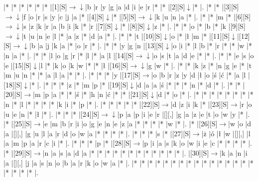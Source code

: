 \documentclass[11pt]{article}
\newcommand\drarr{$\rightarrow \!\!\!\!\! \downarrow$}
\newcommand\rarr{$\rightarrow$}
\newcommand\darr{$\downarrow$}
\begin{document}
\noindent\begin{Puzzle}{19}{21}|*	|*	|*	|*	|*	|*	|[1][S]\drarr	|b	|r	|y	|g	|a	|d	|i	|e	|r	|*	|*	|[2][S]\darr	|*	|.
|*	|*	|[3][S]\drarr	|f	|o	|r	|s	|y	|c	|j	|a	|*	|[4][S]\darr	|*	|[5][S]\drarr	|k	|u	|n	|a	|*	|.
|*	|*	|m	|*	|[6][S]\drarr	|s	|z	|k	|r	|a	|b	|i	|k	|*	|r	|[7][S]\darr	|*	|[8][S]\darr	|z	|*	|.
|*	|*	|o	|*	|b	|*	|k	|[9][S]\drarr	|t	|u	|n	|e	|l	|*	|a	|z	|*	|d	|a	|*	|.
|*	|*	|t	|[10][S]\darr	|o	|*	|ł	|m	|*	|[11][S]\darr	|[12][S]\drarr	|b	|a	|j	|k	|a	|*	|o	|r	|*	|.
|*	|*	|y	|g	|n	|[13][S]\darr	|o	|i	|*	|l	|b	|*	|r	|*	|*	|w	|*	|n	|a	|*	|.
|*	|*	|l	|o	|g	|r	|*	|l	|*	|a	|l	|[14][S]\drarr	|o	|s	|t	|a	|d	|e	|*	|*	|.
|*	|*	|e	|s	|o	|e	|[15][S]\darr	|l	|*	|k	|o	|k	|w	|*	|*	|ł	|[16][S]\drarr	|g	|w	|*	|.
|*	|*	|k	|z	|*	|n	|g	|e	|*	|t	|m	|u	|n	|*	|*	|a	|l	|a	|*	|*	|.
|*	|*	|*	|y	|[17][S]\rarr	|o	|b	|r	|z	|y	|d	|ł	|o	|ś	|ć	|*	|a	|l	|[18][S]\darr	|*	|.
|*	|*	|*	|z	|*	|m	|p	|*	|[19][S]\darr	|d	|a	|a	|ś	|*	|*	|*	|n	|*	|d	|*	|.
|*	|*	|[20][S]\rarr	|m	|p	|a	|*	|*	|ś	|*	|h	|n	|ć	|*	|*	|[21][S]\darr	|d	|*	|o	|*	|.
|*	|*	|*	|*	|*	|*	|*	|*	|n	|*	|l	|*	|*	|*	|*	|k	|i	|*	|p	|*	|.
|*	|*	|*	|*	|*	|[22][S]\rarr	|d	|z	|i	|k	|*	|[23][S]\rarr	|r	|o	|u	|e	|n	|*	|ł	|*	|.
|*	|*	|*	|[24][S]\drarr	|p	|a	|p	|i	|e	|r	|[][,]{ }	|g	|a	|z	|e	|t	|o	|w	|y	|*	|.
|*	|[25][S]\rarr	|e	|m	|b	|r	|i	|o	|g	|e	|n	|e	|z	|a	|*	|*	|*	|*	|w	|*	|.
|*	|[26][S]\rarr	|w	|o	|d	|a	|[][,]{ }	|g	|u	|l	|a	|r	|d	|o	|w	|a	|*	|*	|*	|*	|.
|*	|*	|*	|s	|*	|[27][S]\rarr	|ż	|ó	|ł	|w	|[][,]{ }	|l	|a	|m	|p	|a	|r	|c	|i	|*	|.
|*	|*	|*	|p	|*	|[28][S]\rarr	|p	|i	|a	|s	|k	|o	|w	|i	|e	|c	|*	|*	|*	|*	|.
|*	|[29][S]\rarr	|n	|a	|s	|a	|d	|a	|*	|*	|*	|*	|*	|*	|*	|*	|*	|*	|*	|*	|.
|[30][S]\rarr	|k	|a	|n	|i	|a	|[][,]{ }	|j	|a	|s	|n	|o	|b	|a	|r	|k	|o	|w	|a	|*	|.
|*	|*	|*	|*	|*	|*	|*	|*	|*	|*	|*	|*	|*	|*	|*	|*	|*	|*	|*	|*	|.\end{Puzzle}

\newpage
\end{document}
